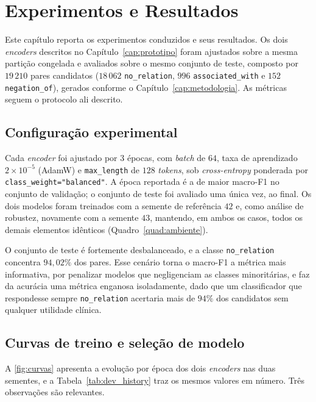 \chapter[Experimentos e Resultados]{Experimentos e Resultados}
\label{cap:experimentos}

Este capítulo reporta os experimentos conduzidos e seus resultados. Os dois
\emph{encoders} descritos no Capítulo~\ref{cap:prototipo} foram ajustados sobre a
mesma partição congelada e avaliados sobre o mesmo conjunto de teste, composto por
$19\,210$ pares candidatos ($18\,062$ \texttt{no\_relation}, $996$
\texttt{associated\_with} e $152$ \texttt{negation\_of}), gerados conforme o
Capítulo~\ref{cap:metodologia}. As métricas seguem o protocolo ali descrito.

\section{Configuração experimental}

Cada \emph{encoder} foi ajustado por $3$ épocas, com \emph{batch} de $64$, taxa de
aprendizado $2\times10^{-5}$ (AdamW) e \texttt{max\_length} de $128$ \emph{tokens},
sob \emph{cross-entropy} ponderada por \texttt{class\_weight="balanced"}. A época
reportada é a de maior macro-F1 no conjunto de validação; o conjunto de teste foi
avaliado uma única vez, ao final. Os dois modelos foram treinados com a semente de
referência $42$ e, como análise de robustez, novamente com a semente $43$,
mantendo, em ambos os casos, todos os demais elementos idênticos
(Quadro~\ref{quad:ambiente}).

O conjunto de teste é fortemente desbalanceado, e a classe \texttt{no\_relation}
concentra $94{,}02\%$ dos pares. Esse cenário torna o macro-F1 a métrica mais
informativa, por penalizar modelos que negligenciam as classes minoritárias, e faz
da acurácia uma métrica enganosa isoladamente, dado que um classificador que respondesse
sempre \texttt{no\_relation} acertaria mais de $94\%$ dos candidatos sem qualquer
utilidade clínica.

\section{Curvas de treino e seleção de modelo}
\label{sec:curvas}

A \autoref{fig:curvas} apresenta a evolução por época dos dois \emph{encoders} nas
duas sementes, e a Tabela~\ref{tab:dev_history} traz os mesmos valores em número.
Três observações são relevantes.

